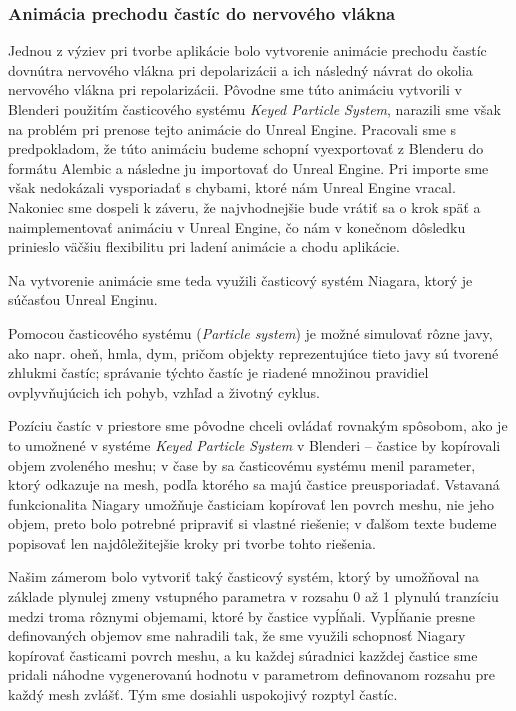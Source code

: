 \subsubsection{Animácia prechodu častíc do nervového vlákna}
Jednou z výziev pri tvorbe aplikácie bolo vytvorenie animácie prechodu častíc dovnútra nervového vlákna pri depolarizácii a ich následný návrat do okolia nervového vlákna pri repolarizácii. 
Pôvodne sme túto animáciu vytvorili v Blenderi použitím časticového systému \emph{Keyed Particle System}, narazili sme však na problém pri prenose tejto animácie do Unreal Engine. Pracovali sme s predpokladom, 
že túto animáciu budeme schopní vyexportovať z Blenderu do formátu Alembic a následne ju importovať do Unreal Engine. Pri importe sme však nedokázali vysporiadať s chybami, ktoré nám Unreal Engine vracal.
Nakoniec sme dospeli k záveru, že najvhodnejšie bude vrátiť sa o krok späť a naimplementovať animáciu v Unreal Engine, čo nám v konečnom dôsledku prinieslo väčšiu flexibilitu pri ladení animácie a chodu aplikácie.

Na vytvorenie animácie sme teda využili časticový systém Niagara, ktorý je súčasťou Unreal Enginu. 

Pomocou časticového systému (\emph{Particle system}) je možné simulovať rôzne javy, ako napr. oheň, hmla, dym, pričom objekty reprezentujúce tieto javy sú tvorené zhlukmi častíc; správanie týchto častíc
je riadené množinou pravidiel ovplyvňujúcich ich pohyb, vzhľad a životný cyklus.

Pozíciu častíc v priestore sme pôvodne chceli ovládať rovnakým spôsobom, ako je to umožnené v systéme \emph{Keyed Particle System} v Blenderi {--} častice by kopírovali objem zvoleného meshu; v čase by 
sa časticovému systému menil parameter, ktorý odkazuje na mesh, podľa ktorého sa majú častice preusporiadať. Vstavaná funkcionalita Niagary umožňuje časticiam kopírovať len povrch meshu, nie jeho objem, 
preto bolo potrebné pripraviť si vlastné riešenie; v ďalšom texte budeme popisovať len najdôležitejšie kroky pri tvorbe tohto riešenia. 

Našim zámerom bolo vytvoriť taký časticový systém, ktorý by umožňoval na základe plynulej zmeny vstupného parametra v rozsahu 0 až 1 plynulú tranzíciu medzi troma rôznymi objemami, ktoré by častice vypĺňali.
Vypĺňanie presne definovaných objemov sme nahradili tak, že sme využili schopnosť Niagary kopírovať časticami povrch meshu, a ku každej súradnici kazždej častice sme pridali náhodne vygenerovanú hodnotu v 
parametrom definovanom rozsahu pre každý mesh zvlášť. Tým sme dosiahli uspokojivý rozptyl častíc.

